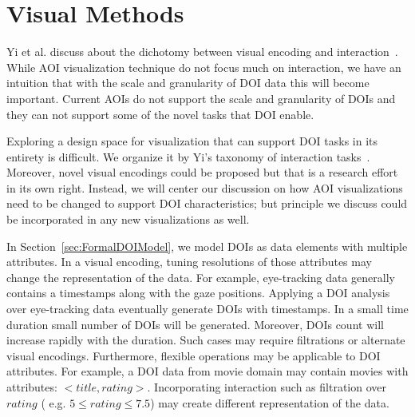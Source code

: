 \section{Visual Methods}
Yi et al. discuss about the dichotomy between visual encoding and interaction~\cite{yi2007toward}. While AOI visualization technique do not focus much on interaction, we have an intuition that with the scale and granularity of DOI data this will become important. Current AOIs do not support the scale and granularity of DOIs and they can not support some of the novel tasks that DOI enable. 

Exploring a design space for visualization that can support DOI tasks in its entirety is difficult. We organize it by Yi's taxonomy of interaction tasks~\cite{yi2007toward}. Moreover, novel visual encodings could be proposed but that is a research effort in its own right. Instead, we will center our discussion on how AOI visualizations need to be changed to support DOI characteristics; but principle we discuss could be incorporated in any new visualizations as well.

In Section~\ref{sec:FormalDOIModel}, we model DOIs as data elements with multiple attributes. In a visual encoding, tuning resolutions of those attributes may change the representation of the data. For example, eye-tracking data generally contains a timestamps along with the gaze positions. Applying a DOI analysis over eye-tracking data eventually generate DOIs with timestamps. In a small time duration small number of DOIs will be generated. Moreover, DOIs count will increase rapidly with the duration. Such cases may require filtrations or alternate visual encodings. Furthermore, flexible operations may be applicable to DOI attributes. For example, a DOI data from movie domain may contain movies with attributes: $<title, rating>$. Incorporating interaction such as filtration over $rating$ ( e.g. $5 \leq rating \leq 7.5 $) may create different representation of the data.

